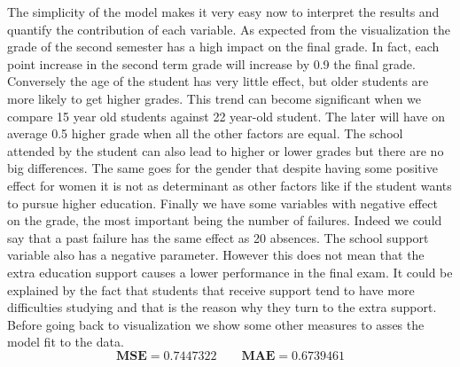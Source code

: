 \documentclass[a4paper, 11pt]{article}
\theoremstyle{definition}
\numberwithin{equation}{section}		%
\numberwithin{table}{section}				%
\begin{document}
The simplicity of the model makes it very easy now to interpret the results and quantify the contribution of each variable. As expected from the visualization the grade of the second semester has a high impact on the final grade. In fact, each point increase in the second term grade will increase by 0.9 the final grade. Conversely the age of the student has very little effect, but older students are more likely to get higher grades. This trend can become significant when we compare 15 year old students against 22 year-old student. The later will have on average 0.5 higher grade when all the other factors are equal. The school attended by the student can also lead to higher or lower grades but there are no big differences. The same goes for the gender that despite having some positive effect for women it is not as determinant as other factors like if the student wants to pursue higher education. Finally we have some variables with negative effect on the grade, the most important being the number of failures. Indeed we could say that a past failure has the same effect as 20 absences. The school support variable also has a negative parameter. However this does not mean that the extra education support causes a lower performance in the final exam. It could be explained by the fact that students that receive support tend to have more difficulties studying and that is the reason why they turn to the extra support. 
\\[0.3in]
Before going back to visualization we show some other measures to asses the model fit to the data.
$$
\boxed{\textbf{MSE} = 0.7447322 \quad \quad \textbf{MAE} = 0.6739461}
$$
\newpage
\end{document}
